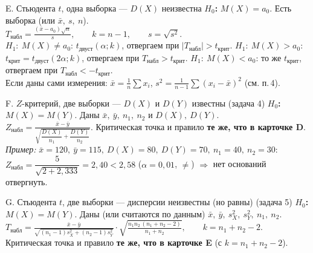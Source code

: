 \documentclass[a4paper,10pt]{extarticle}
\newcommand{\kr}{\text{крит}}\newcommand{\nab}{\text{набл}}
\begin{document}
\begin{card}{E. Стьюдента $t$, одна выборка --- $D(X)$ неизвестна}
\textbf{$H_0$:} $M(X)=a_0$. \quad Есть выборка (или $\bar x,\ s,\ n$).\\
$\displaystyle T_{\nab}=\frac{(\bar x-a_0)\sqrt n}{s},\qquad k=n-1,\qquad s=\sqrt{s^2}.$\\
$H_1:\ M(X)\ne a_0$: $t_{\text{двуст}}(\alpha;k)$, отвергаем при $|T_{\nab}|>t_\kr$. \;
$H_1:\ M(X)>a_0$: $t_\kr=t_{\text{двуст}}(2\alpha;k)$, отвергаем при $T_{\nab}>t_\kr$. \;
$H_1:\ M(X)<a_0$: то же $t_\kr$, отвергаем при $T_{\nab}<-t_\kr$.\\
Если даны сами измерения: $\bar x=\frac1n\sum x_i$, $s^2=\frac{1}{n-1}\sum(x_i-\bar x)^2$ (см. п.\,4).
\end{card}

\begin{card}{F. $Z$-критерий, две выборки --- $D(X)$ и $D(Y)$ известны \hfill (задача 4)}
\textbf{$H_0$:} $M(X)=M(Y)$. \quad Даны $\bar x,\ \bar y,\ n_1,\ n_2$ и $D(X),\ D(Y)$.\\
$\displaystyle Z_{\nab}=\frac{\bar x-\bar y}{\sqrt{\dfrac{D(X)}{n_1}+\dfrac{D(Y)}{n_2}}}.$ \quad Критическая точка и правило \textbf{те же, что в карточке D}.\\
\emph{Пример:} $\bar x=120,\ \bar y=115,\ D(X)=80,\ D(Y)=70,\ n_1=40,\ n_2=30$: $Z_{\nab}=\dfrac{5}{\sqrt{2+2{,}333}}=2{,}40<2{,}58$ ($\alpha=0{,}01$, $\ne$) $\Rightarrow$ нет оснований отвергнуть.
\end{card}

\begin{card}{G. Стьюдента $t$, две выборки --- дисперсии неизвестны (но равны) \hfill (задача 5)}
\textbf{$H_0$:} $M(X)=M(Y)$. \quad Даны (или считаются по данным) $\bar x,\ \bar y,\ s_X^2,\ s_Y^2,\ n_1,\ n_2$.\\
$\displaystyle T_{\nab}=\frac{\bar x-\bar y}{\sqrt{(n_1-1)s_X^2+(n_2-1)s_Y^2}}\cdot\sqrt{\frac{n_1n_2\,(n_1+n_2-2)}{n_1+n_2}},\qquad k=n_1+n_2-2.$\\
Критическая точка и правило \textbf{те же, что в карточке E} (с $k=n_1+n_2-2$).
\end{card}

\newpage
\end{document}
